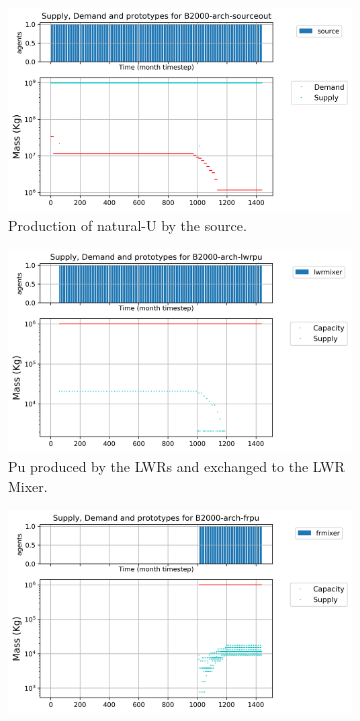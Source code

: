 \documentclass[11pt]{article}
\begin{document}
\begin{figure}[!htbp]
	\centering
	\begin{subfigure}[t]{.8\textwidth}
		\centering
		\includegraphics[width=\linewidth]{B2000-arch-sourceout.png} 
		\caption{Production of natural-U by the source.}
		\label{fig:23-arch-sourceout}
	\end{subfigure}
	\vspace{.9cm}
	\begin{subfigure}[t]{.45\textwidth}
		\centering
		\includegraphics[width=\linewidth]{B2000-arch-lwrpu.png} 
		\caption{Pu produced by the LWRs and exchanged to the LWR Mixer.}
		\label{fig:23-arch-lwrpu}
	\end{subfigure}
	\begin{subfigure}[t]{.45\textwidth}
	\centering
	\includegraphics[width=\linewidth]{B2000-arch-frpu.png} 

\end{subfigure}
\end{figure}
\end{document}
